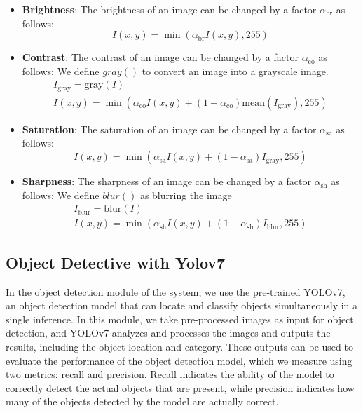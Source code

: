 \documentclass{PHlab-thesis}
\begin{document}
\begin{itemize}
\item \textbf{Brightness}: The brightness of an image can be changed by a factor $\alpha_{\text{br}}$ as follows:
\begin{equation*}
I(x,y)=\min(\alpha_{\text{br}} I(x,y),255)
\end{equation*}

\item \textbf{Contrast}: The contrast of an image can be changed by a factor $\alpha_{\text{co}}$ as follows: We define $gray()$ to convert an image into a grayscale image.
\begin{gather*}
I_{\text{gray}}=\text{gray}(I)\\
I(x,y)=\min(\alpha_{\text{co}} I(x,y)+(1-\alpha_{\text{co}})\text{mean}(I_{\text{gray}}),255)
\end{gather*}

\item \textbf{Saturation}: The saturation of an image can be changed by a factor $\alpha_{\text{sa}}$ as follows:
\begin{equation*}
I(x,y)=\min(\alpha_{\text{sa}} I(x,y)+(1-\alpha_{\text{sa}})I_{\text{gray}},255)
\end{equation*}

\item \textbf{Sharpness}: The sharpness of an image can be changed by a factor $\alpha_{\text{sh}}$ as follows: We define $blur()$ as blurring the image
\begin{gather*}
I_{\text{blur}}=\text{blur}(I) \\
I(x,y)=\min(\alpha_{\text{sh}} I(x,y)+(1-\alpha_{\text{sh}})I_{\text{blur}},255)
\end{gather*}
\end{itemize}

\subsection{Object Detective with Yolov7}
In the object detection module of the system, we use the pre-trained YOLOv7, an object detection model that can locate and classify objects simultaneously in a single inference. In this module, we take pre-processed images as input for object detection, and YOLOv7 analyzes and processes the images and outputs the results, including the object location and category. These outputs can be used to evaluate the performance of the object detection model, which we measure using two metrics: recall and precision. Recall indicates the ability of the model to correctly detect the actual objects that are present, while precision indicates how many of the objects detected by the model are actually correct.
\end{document}

